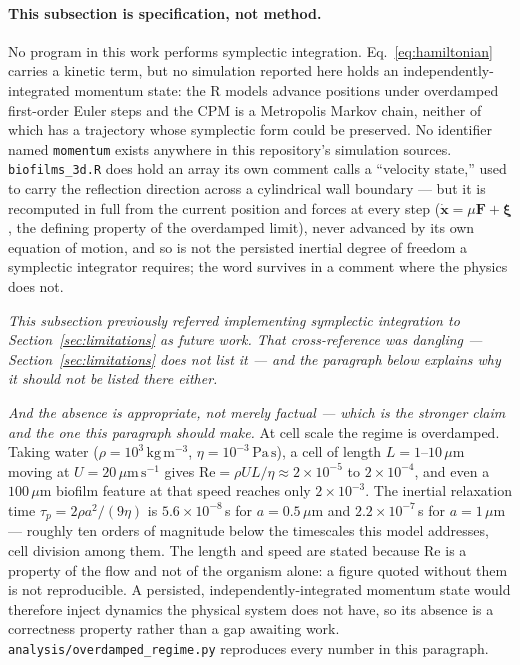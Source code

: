 \documentclass[11pt]{article}
\begin{document}
\paragraph{This subsection is specification, not method.}
No program in this work performs symplectic integration. Eq.~\ref{eq:hamiltonian} carries a kinetic
term, but no simulation reported here holds an independently-integrated momentum state: the R
models advance positions under overdamped first-order Euler steps and the CPM is a Metropolis
Markov chain, neither of which has a trajectory whose symplectic form could be preserved. No
identifier named \texttt{momentum} exists anywhere in this repository's simulation sources.
\texttt{biofilms\_3d.R} does hold an array its own comment calls a ``velocity state,'' used to
carry the reflection direction across a cylindrical wall boundary --- but it is recomputed in
full from the current position and forces at every step ($\dot{\mathbf{x}} = \mu\mathbf{F} +
\boldsymbol{\xi}$, the defining property of the overdamped limit), never advanced by its own
equation of motion, and so is not the persisted inertial degree of freedom a symplectic
integrator requires; the word survives in a comment where the physics does not.

\emph{This subsection previously referred implementing symplectic integration to
Section~\ref{sec:limitations} as future work. That cross-reference was dangling ---
Section~\ref{sec:limitations} does not list it --- and the paragraph below explains why it
should not be listed there either.}

\emph{And the absence is appropriate, not merely factual --- which is the stronger claim and
the one this paragraph should make.} At cell scale the regime is overdamped. Taking water
($\rho = 10^{3}\,\mathrm{kg\,m^{-3}}$, $\eta = 10^{-3}\,\mathrm{Pa\,s}$), a cell of
length $L = 1$--$10\,\mu$m moving at $U = 20\,\mu\mathrm{m\,s^{-1}}$ gives
$\mathrm{Re} = \rho U L/\eta \approx 2\times10^{-5}$ to $2\times10^{-4}$, and even a
$100\,\mu$m biofilm feature at that speed reaches only $2\times10^{-3}$. The inertial
relaxation time $\tau_p = 2\rho a^{2}/(9\eta)$ is $5.6\times10^{-8}\,$s for
$a = 0.5\,\mu$m and $2.2\times10^{-7}\,$s for $a = 1\,\mu$m --- roughly ten orders of
magnitude below the timescales this model addresses, cell division among them. The length and
speed are stated because $\mathrm{Re}$ is a property of the flow and not of the organism
alone: a figure quoted without them is not reproducible. A persisted, independently-integrated
momentum state would therefore inject dynamics the physical system does not have, so its
absence is a correctness property rather than a gap awaiting work.
\texttt{analysis/overdamped\_regime.py} reproduces every number in this paragraph.
\end{document}
